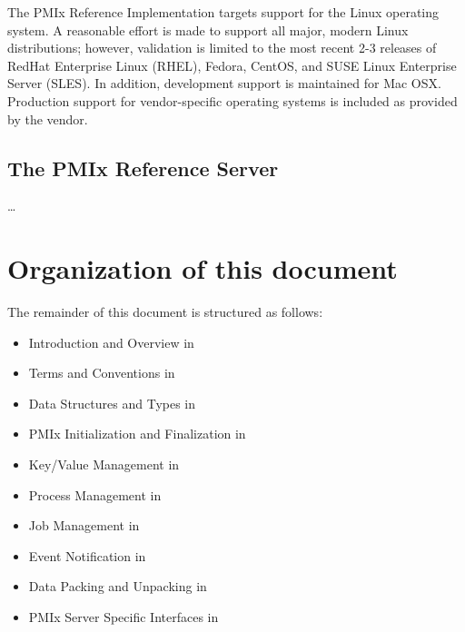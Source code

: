 The \ac{PMIx} Reference Implementation targets support for the Linux operating system.
A reasonable effort is made to support all major, modern Linux distributions; however, validation is limited to the most recent 2-3 releases of RedHat Enterprise Linux (RHEL), Fedora, CentOS, and SUSE Linux Enterprise Server (SLES).
In addition, development support is maintained for Mac OSX.
Production support for vendor-specific operating systems is included as provided by the vendor.

\subsection{The PMIx Reference Server}

\ldots


\section{Organization of this document}

The remainder of this document is structured as follows:

\begin{itemize}
\item Introduction and Overview in 
\item Terms and Conventions in 
\item Data Structures and Types in 
\item \ac{PMIx} Initialization and Finalization in 
\item Key/Value Management in 
\item Process Management in 
\item Job Management in 
\item Event Notification in 
\item Data Packing and Unpacking in 
\item \ac{PMIx} Server Specific Interfaces in 
\end{itemize}

